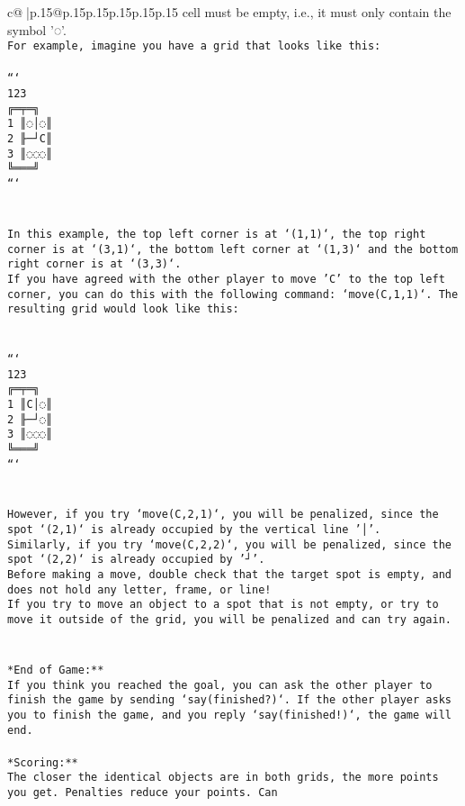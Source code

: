 \documentclass{article}
\begin{document}
{\begin{supertabular}{c@{$\;$}|p{.15\linewidth}@{}p{.15\linewidth}p{.15\linewidth}p{.15\linewidth}p{.15\linewidth}p{.15\linewidth}}
{{{cell must be empty, i.e., it must only contain the symbol '◌'.\\ \tt * For example, imagine you have a grid that looks like this: \\ \tt \\ \tt ```\\ \tt     123\\ \tt    ╔═╤═╗\\ \tt  1 ║◌│◌║\\ \tt  2 ╟─┘C║\\ \tt  3 ║◌◌◌║\\ \tt    ╚═══╝\\ \tt ```\\ \tt \\ \tt \\ \tt * In this example, the top left corner is at `(1,1)`, the top right corner is at `(3,1)`, the bottom left corner at `(1,3)` and the bottom right corner is at `(3,3)`.\\ \tt * If you have agreed with the other player to move 'C' to the top left corner, you can do this with the following command: `move(C,1,1)`. The resulting grid would look like this: \\ \tt \\ \tt \\ \tt ```\\ \tt     123\\ \tt    ╔═╤═╗\\ \tt  1 ║C│◌║\\ \tt  2 ╟─┘◌║\\ \tt  3 ║◌◌◌║\\ \tt    ╚═══╝\\ \tt ```\\ \tt \\ \tt \\ \tt * However, if you try `move(C,2,1)`, you will be penalized, since the spot `(2,1)` is already occupied by the vertical line '│'.\\ \tt * Similarly, if you try `move(C,2,2)`, you will be penalized, since the spot `(2,2)` is already occupied by '┘'.\\ \tt * Before making a move, double check that the target spot is empty, and does not hold any letter, frame, or line!\\ \tt * If you try to move an object to a spot that is not empty, or try to move it outside of the grid, you will be penalized and can try again.\\ \tt \\ \tt \\ \tt **End of Game:**\\ \tt If you think you reached the goal, you can ask the other player to finish the game by sending `say(finished?)`. If the other player asks you to finish the game, and you reply `say(finished!)`, the game will end.\\ \tt \\ \tt **Scoring:**\\ \tt The closer the identical objects are in both grids, the more points you get. Penalties reduce your points. Can }}}
\end{supertabular}}
\end{document}
